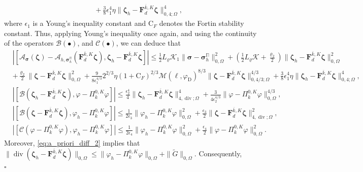 \documentclass[fleqn,a4paper]{cas-sc}
\newcommand\vdiv{\mathop{\mathrm{div}}\nolimits}
\newcommand{\bF}{\mathbf{F}}
\newcommand{\bzeta}{\boldsymbol{\zeta}}
\newcommand{\0}{\boldsymbol{0}}
\newcommand\bbPi{\mathbb{\Pi}}
\newcommand\bsigma{\boldsymbol{\sigma}}
\numberwithin{equation}{section}
\numberwithin{figure}{section}
\newenvironment{proof}{\noindent{\it Proof.}}{\hfill$\square$}
\begin{document}
\begin{proof}
\begin{align*}
        &\quad  +\frac{3}{8}\epsilon_1^4\eta\|\bzeta_h-\bF_d^{\overline{k},K}\bzeta\|^{4}_{{0,4;\Omega}},
        \end{align*}
where $\epsilon_1$ is a Young's inequality constant and $\mathrm{C}_F$ denotes the Fortin stability constant. Thus, applying Young's inequality once again, and using the continuity of the operators
$\mathcal{B}(\bullet)$, and $\mathcal{C}(\bullet)$,
we can deduce that
\begin{subequations}\label{bounds_a_priori_diff}
    \begin{align}
        &|[\mathcal{A}_{\bsigma}(\bzeta)-\mathcal{A}_{h,\bsigma_h^{\bbPi}}(\bF_d^{\overline{k},K}\bzeta), \bzeta_h - \bF_d^{\overline{k},K}\bzeta]|\leq\frac{1}{2}L_\varrho\mathcal{K}_1\|\bsigma-{\bsigma}_h^\bbPi\|^2_{0,\Omega}+\left(\frac{1}{2}L_\varrho\mathcal{K}+\frac{\varrho_2}{2}\right)\|\bzeta_h-\bF_d^{\overline{k},K}\bzeta\|^2_{{0,\Omega}}\nonumber\\
        & +\frac{\varrho_2}{2}\|\bzeta-\bF_d^{\overline{k},K}\bzeta\|^2_{{0,\Omega}} + \frac{9}{8\epsilon_1^{4/3}} 2^{2/3}\eta(1+\mathrm{C}_F)^{2/3}\mathcal{M}(\ell, \varphi_{\mathrm{D}})^{8/3}\|\bzeta-\bF_d^{\overline{k},K}\bzeta\|^{4/3}_{{0,4/3;\Omega}}+\frac{3}{8}\epsilon_1^4\eta\|\bzeta_h-\bF_d^{\overline{k},K}\bzeta\|^{4}_{{0,4;\Omega}} ,\\
        &|[\mathcal{B}(\bzeta_h - \bF_d^{\overline{k},K}\bzeta), \varphi-\Pi_k^{0,K}\varphi]|\leq \frac{\epsilon_2^4}{4}\|\bzeta_h - \bF_d^{\overline{k},K}\bzeta\|_{4,\vdiv;\Omega}^4+\frac{3}{4\epsilon_2^{4/3}}\|\varphi-\Pi_k^{0,K}\varphi\|_{0,\Omega}^{4/3},\\
        &|[\mathcal{B}(\bzeta-\bF_d^{\overline{k},K}\bzeta),\varphi_h-\Pi_k^{0,K}\varphi]|\leq \frac{1}{2\epsilon_3}\|\varphi_h-\Pi_k^{0,K}\varphi\|_{0,\Omega}^2+ \frac{\epsilon_3}{2}\|\bzeta-\bF_d^{\overline{k},K}\bzeta\|^2_{4,\vdiv;\Omega} ,\\
        &|[\mathcal{C}(\varphi-\Pi_k^{0,K}\varphi),\varphi_h-\Pi_k^{0,K}\varphi]|\leq \frac{1}{2\epsilon_4}\|\varphi_h-\Pi_k^{0,K}\varphi\|_{0,\Omega}^2+\frac{\epsilon_4}{2}\|\varphi-\Pi_k^{0,K}\varphi\|_{0,\Omega}^2.
    \end{align}   
    \end{subequations}
    Moreover, \eqref{eq:a_priori_diff_2} implies that $\|\vdiv(\bzeta_h - \bF_d^{\overline{k},K}\bzeta) \|_{0,\Omega} \leq \|\varphi_h - \Pi_k^{0,K}\varphi \|_{0,\Omega} + \|\widetilde{G} \|_{0,\Omega}$. Consequently,
\begin{equation*}%

\end{equation*}
\end{proof}
\end{document}
